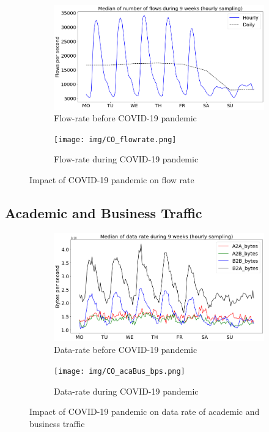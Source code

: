 \documentclass[10pt, journal, letterpaper]{IEEEtran}
\newcommand\linearFigSze{0.48}
\begin{document}
\begin{figure}
    \begin{subfigure}{\linearFigSze\textwidth}
          \centering
          \includegraphics[width=\columnwidth]{img/BCO_flowrate.png}
          \caption{Flow-rate before COVID-19 pandemic}
          \label{fig:BCO_fps}
    \end{subfigure}
    \begin{subfigure}{\linearFigSze\textwidth}
          \centering
          \texttt{[image: img/CO\_flowrate.png]}
          \caption{Flow-rate during COVID-19 pandemic}
          \label{fig:CO_fps}
    \end{subfigure}
    \caption{Impact of COVID-19 pandemic on flow rate}
    \label{fig:flowrate_BCO_CO}
\end{figure}

\subsection{Academic and Business Traffic}
\begin{figure}
    \begin{subfigure}{\linearFigSze\textwidth}
          \centering
          \includegraphics[width=\columnwidth]{img/BCO_acaBus_bps.png}
          \caption{Data-rate before COVID-19 pandemic}
          \label{fig:BCO_acaBus_bps}
    \end{subfigure}
    \begin{subfigure}{\linearFigSze\textwidth}
          \centering
          \texttt{[image: img/CO\_acaBus\_bps.png]}
          \caption{Data-rate during COVID-19 pandemic}
          \label{fig:CO_acaBus_bps}
    \end{subfigure}
    \caption{Impact of COVID-19 pandemic on data rate of academic and business traffic}
    \label{fig:datarate_acaBus_BCO_CO}
\end{figure}
\end{document}
